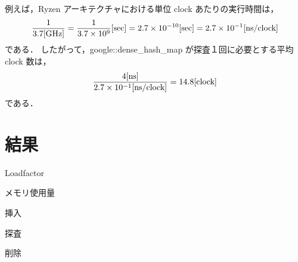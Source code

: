 例えば，Ryzen アーキテクチャにおける単位 clock あたりの実行時間は，
\begin{align*}
  \frac{1}{3.7 {\rm [GHz]}}
  = \frac{1}{3.7 \times 10^9}{\rm [sec]}
  = 2.7 \times 10^{-10}{\rm [sec]}
  = 2.7 \times 10^{-1}{\rm [ns/clock]}
\end{align*}
である．
したがって，google::dense\_hash\_map が探査１回に必要とする平均 clock 数は，
\begin{align*}
  \frac{ 4 {\rm [ns]} }{ 2.7 \times 10^{-1}{\rm [ns/clock]} }
  = 14.8 {\rm [clock]}
\end{align*}
である．

\section{結果}

Loadfactor

メモリ使用量

挿入

探査

削除













